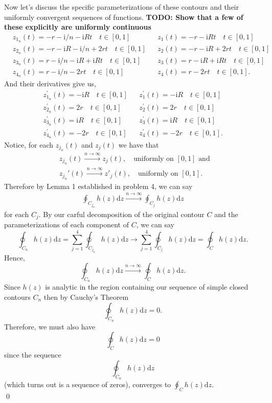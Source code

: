 \documentclass[10pt]{amsart}
\newcommand{\D}{\mathrm{d}}
\newcommand{\I}{\mathrm{i}}
\theoremstyle{nonumberplain}
\begin{document}
\begin{enumerate}[label={\bf {\arabic*}:}]
\begin{itemize}
\noindent
Now let's discuss the specific parameterizations of these contours and their uniformly convergent sequences of functions. \textbf{TODO: Show that a few of these explicitly are uniformly continuous}
\begin{align*}
&z_{1_n}(t) = -r - \I/n -\I R t \quad t \in [0, 1]& &z_1(t) = -r -\I R t \quad t \in [0, 1]& \\
&z_{2_n}(t) = -r - \I R - \I/n + 2rt \quad t \in [0, 1]& &z_2(t) = -r - \I R + 2rt \quad t \in [0, 1]& \\
&z_{3_n}(t) = r - \I/n -\I R + \I R t \quad t \in [0, 1]& &z_3(t) = r -\I R + \I R t \quad t \in [0, 1]& \\
&z_{4_n}(t) = r - \I/n - 2rt \quad t \in [0, 1]& &z_4(t) = r - 2rt \quad t \in [0, 1].&
\end{align*}
And their derivatives give us,
\begin{align*}
&z_{1_n}^\prime(t) = -\I R \quad t \in [0, 1]& &z_1^\prime(t) = -\I R \quad t \in [0, 1]& \\
&z_{2_n}^\prime(t) = 2r \quad t \in [0, 1]& &z_2^\prime(t) = 2r \quad t \in [0, 1]& \\
&z_{3_n}^\prime(t) = \I R \quad t \in [0, 1]& &z_3^\prime(t) = \I R \quad t \in [0, 1]& \\
&z_{4_n}^\prime(t) = - 2r \quad t \in [0, 1]& &z_4^\prime(t) = - 2r \quad t \in [0, 1].&
\end{align*}
Notice, for each $z_{j_n}(t)$ and $z_j(t)$ we have that
\begin{align*}
	&z_{j_n}(t) \overset{n \to \infty}{\longrightarrow} z_j(t),  \quad \text{uniformly on } [0,1] \text{ and }\\
        &z_{j_n}'(t) \overset{n \to \infty}{\longrightarrow} z'_j(t), \quad \text{uniformly on } [0,1].
\end{align*}
Therefore by Lemma 1 established in problem 4, we can say
\begin{align*}
\oint_{C_{j_n}}h(z)\D z \overset{n \to \infty}{\longrightarrow} \oint_{C_j}h(z)\D z
\end{align*}
for each $C_j$.
By our carful decomposition of the original contour $C$ and the parameterizations of each component of $C$, we can say 
$$\oint_{C_n} h(z) \D z = \sum_{j = 1}^{4} \oint_{C_{j_n}}h(z) \D z \rightarrow \sum_{j = 1}^{4} \oint_{C_j}h(z) \D z = \oint_{C}h(z)\D z.$$
Hence,
$$\oint_{C_n}h(z)\D z \overset{n \to \infty}{\longrightarrow} \oint_{C}h(z)\D z.$$
Since $h(z)$ is analytic in the region containing our sequence of simple closed contours $C_n$ then by Cauchy's Theorem
$$
\oint_{C_n}h(z)\D z = 0.
$$
Therefore, we must also have
$$\oint_{C}h(z)\D z = 0$$
since the sequence $$\oint_{C_n}h(z)\D z$$ (which turns out is a sequence of zeros), converges to $\oint_{C}h(z)\D z$. \\
\qed \\


\end{itemize}
\end{enumerate}
\end{document}
